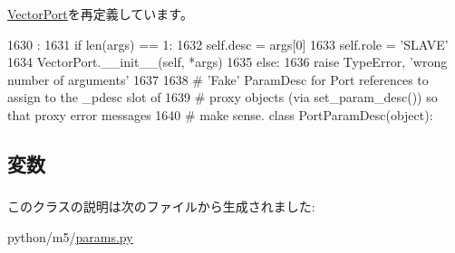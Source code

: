 \hyperlink{classm5_1_1params_1_1VectorPort_ac775ee34451fdfa742b318538164070e}{VectorPort}を再定義しています。


\begin{DoxyCode}
1630                              :
1631         if len(args) == 1:
1632             self.desc = args[0]
1633             self.role = 'SLAVE'
1634             VectorPort.__init__(self, *args)
1635         else:
1636             raise TypeError, 'wrong number of arguments'
1637 
1638 # 'Fake' ParamDesc for Port references to assign to the _pdesc slot of
1639 # proxy objects (via set_param_desc()) so that proxy error messages
1640 # make sense.
class PortParamDesc(object):
\end{DoxyCode}


\subsection{変数}
\hypertarget{classm5_1_1params_1_1VectorSlavePort_aafc566bb08a9f46485e7238669581c2b}{
\subsubsection[{desc}]{}}
\label{classm5_1_1params_1_1VectorSlavePort_aafc566bb08a9f46485e7238669581c2b}
\hypertarget{classm5_1_1params_1_1VectorSlavePort_a4e0cdb878325d53ad79a74504bf97a96}{
\subsubsection[{role}]{}}
\label{classm5_1_1params_1_1VectorSlavePort_a4e0cdb878325d53ad79a74504bf97a96}


このクラスの説明は次のファイルから生成されました:\begin{DoxyCompactItemize}
\item 
python/m5/\hyperlink{params_8py}{params.py}\end{DoxyCompactItemize}
